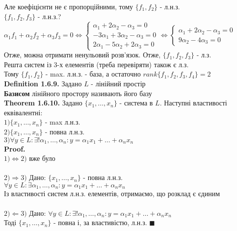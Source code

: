 \documentclass[a4paper, 14pt]{extarticle}
\def\defin#1{\textbf{Definition {#1}}}
\def\th#1{\textbf{Theorem {#1}}}
\def\proof{\textbf{Proof.}\\}
\def\bigline{\vspace{5mm}\\}
\def\qed{$\blacksquare$}
\begin{document}
	Але коефіцієнти не є пропорційними, тому $\{f_1, f_2\}$ - л.н.з.\\
	$\{f_1, f_2, f_3\}$ - л.н.з.? \\
	$\alpha_1 f_1 + \alpha_2 f_2 + \alpha_3 f_3 = 0 \iff 
	\begin{cases}
	\alpha_1 + 2\alpha_2 - \alpha_3 = 0 \\
	-3\alpha_1 + 3\alpha_2 - \alpha_3 = 0 \\
	2\alpha_1 - 5\alpha_2 + 2\alpha_3 = 0
	\end{cases} \iff
	\begin{cases}
	\alpha_1 + 2\alpha_2 - \alpha_3 = 0 \\
	9\alpha_2 - 4\alpha_3 = 0
	\end{cases}
	$\\
	Отже, можна отримати ненульовий розв'язок. Отже, $\{f_1, f_2, f_3\}$ - л.з.\\
	Решта систем із 3-х елементів (треба перевіряти) також є л.з.\\
	Тому $\{f_1, f_2\}$ - max. л.н.з. - база, а остаточно $rank\{f_1, f_2, f_3, f_4 \} = 2$
	\bigline
	\defin{1.6.9.} Задано $L$ - лінійний простір\\
	\textbf{Базисом} лінійного простору називають його базу
	\bigline
	\th{1.6.10.} Задано $\{x_1, \dots, x_n\}$ - система в $L$. Наступні властивості еквівалентні:\\
	$1) \{x_1, \dots, x_n\}$ - max л.н.з.\\
	$2) \{x_1, \dots, x_n\}$ - повна л.н.з.\\
	$3) \forall y \in L: \exists! \alpha_1, \dots, \alpha_n: y = \alpha_1 x_1 + \dots + \alpha_n x_n$\\
	\proof
	$\boxed{1) \Leftrightarrow 2)}$ вже було\\
	\\
	$\boxed{2) \Rightarrow 3)}$ Дано: $\{x_1, \dots, x_n\}$ - повна л.н.з.\\
	$\forall y \in L: \exists \alpha_1, \dots, \alpha_n: y = \alpha_1 x_1 + \dots + \alpha_n x_n$\\
	Із властивості систем л.н.з. елементів, отримаємо, що розклад є єдиним\\
	\\
	$\boxed{2) \Leftarrow 3)}$ Дано: $\forall y \in L: \exists! \alpha_1, \dots, \alpha_n: y = \alpha_1 x_1 + \dots + \alpha_n x_n$\\
	Тоді $\{x_1, \dots, x_n\}$ - повна і, за властивістю, л.н.з. \qed
	\\
	\\
\end{document}

